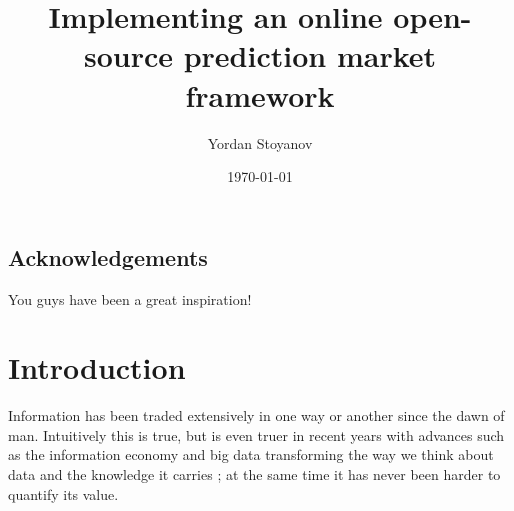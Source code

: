 \documentclass[bsc,frontabs,twoside,singlespacing,parskip,deptreport]{infthesis}     %
\begin{document}
\title{Implementing an online open-source prediction market framework}

\author{Yordan Stoyanov}



\date{\today}


\maketitle

\section*{Acknowledgements}
You guys have been a great inspiration!

\tableofcontents



\chapter{Introduction}

Information has been traded extensively in one way or another since the dawn of man. Intuitively this is true, but is even truer in recent years with advances such as the information economy and big data transforming the way we think about data and the knowledge it carries \cite{mcgee_managing_1993}; at the same time it has never been harder to quantify its value. 
\end{document}
